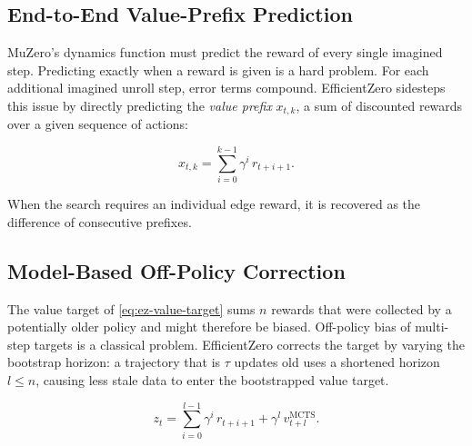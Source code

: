\subsection{End-to-End Value-Prefix Prediction}\label{sec:ez-value-prefix}

MuZero's dynamics function must predict the reward of every single imagined
step.
Predicting exactly when a reward is given is a hard problem.
For each additional imagined unroll step, error terms compound.
EfficientZero sidesteps this issue by directly predicting the \emph{value prefix} $x_{t,k}$,
a sum of discounted rewards over a given sequence of actions:

\begin{equation}\label{eq:ez-value-prefix}
  x_{t,k}=\sum_{i=0}^{k-1}\gamma^{i}\,r_{t+i+1}.
\end{equation}

When the search requires an individual edge reward, it is recovered as the
difference of consecutive prefixes.

\subsection{Model-Based Off-Policy Correction}\label{sec:ez-off-policy}

The value target of \cref{eq:ez-value-target} sums $n$ rewards that were
collected by a potentially older policy and might therefore be biased.
Off-policy bias of multi-step targets is a classical problem.
EfficientZero corrects the target by varying the bootstrap horizon:
a trajectory that is $\tau$ updates old uses a shortened horizon $l\leq n$,
causing less stale data to enter the bootstrapped value target.

\begin{equation}\label{eq:ez-corrected-target}
  z_t=\sum_{i=0}^{l-1}\gamma^{i}\,r_{t+i+1}+\gamma^{l}\,v^{\text{MCTS}}_{t+l}.
\end{equation}
